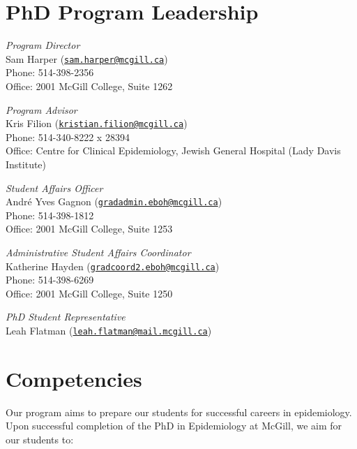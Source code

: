 \documentclass[
  openany]{book}
\begin{document}
\hypertarget{phd-program-leadership}{%
\section{PhD Program Leadership}\label{phd-program-leadership}}

\emph{Program Director}\\
Sam Harper (\href{mailto:sam.harper@mcgill.ca}{\nolinkurl{sam.harper@mcgill.ca}})\\
Phone: 514-398-2356\\
Office: 2001 McGill College, Suite 1262

\emph{Program Advisor}\\
Kris Filion (\href{mailto:kristian.filion@mcgill.ca}{\nolinkurl{kristian.filion@mcgill.ca}})\\
Phone: 514-340-8222 x 28394\\
Office: Centre for Clinical Epidemiology, Jewish General Hospital (Lady Davis Institute)

\emph{Student Affairs Officer}\\
André Yves Gagnon (\href{mailto:gradadmin.eboh@mcgill.ca}{\nolinkurl{gradadmin.eboh@mcgill.ca}})\\
Phone: 514-398-1812\\
Office: 2001 McGill College, Suite 1253

\emph{Administrative Student Affairs Coordinator}\\
Katherine Hayden (\href{mailto:gradcoord2.eboh@mcgill.ca}{\nolinkurl{gradcoord2.eboh@mcgill.ca}})\\
Phone: 514-398-6269\\
Office: 2001 McGill College, Suite 1250

\emph{PhD Student Representative}\\
Leah Flatman (\href{mailto:leah.flatman@mail.mcgill.ca}{\nolinkurl{leah.flatman@mail.mcgill.ca}})

\hypertarget{competencies}{%
\section{Competencies}\label{competencies}}

Our program aims to prepare our students for successful careers in epidemiology. Upon successful completion of the PhD in Epidemiology at McGill, we aim for our students to:
\end{document}
